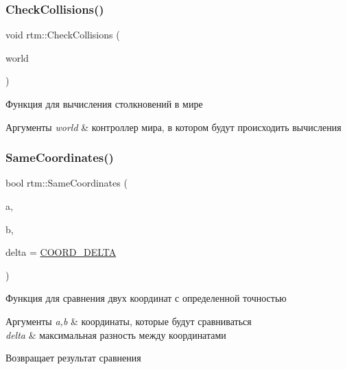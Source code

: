 \subsubsection{\texorpdfstring{Check\+Collisions()}{CheckCollisions()}}
{\footnotesize\ttfamily void rtm\+::\+Check\+Collisions (\begin{DoxyParamCaption}\item[{\hyperlink{classrtm_1_1_world_controller}{World\+Controller} $\ast$const}]{world }\end{DoxyParamCaption})}

Функция для вычисления столкновений в мире 
\begin{DoxyParams}{Аргументы}
{\em world} & контроллер мира, в котором будут происходить вычисления \\
\hline
\end{DoxyParams}
\mbox{\label{namespacertm_aa633b82b63b7cff4e9b08bf6a05ec383}} 
\subsubsection{\texorpdfstring{Same\+Coordinates()}{SameCoordinates()}}
{\footnotesize\ttfamily bool rtm\+::\+Same\+Coordinates (\begin{DoxyParamCaption}\item[{float}]{a,  }\item[{float}]{b,  }\item[{float}]{delta = {\ttfamily \hyperlink{namespacertm_a9ae158a8873bdf59aa9872cdada6c657}{C\+O\+O\+R\+D\+\_\+\+D\+E\+L\+TA}} }\end{DoxyParamCaption})}

Функция для сравнения двух координат с определенной точностью 
\begin{DoxyParams}{Аргументы}
{\em a,b} & координаты, которые будут сравниваться \\
\hline
{\em delta} & максимальная разность между координатами \\
\hline
\end{DoxyParams}
\begin{DoxyReturn}{Возвращает}
результат сравнения 
\end{DoxyReturn}
\mbox{\label{namespacertm_a511bf31b8bfc36474baaf915bc11a619}} 

